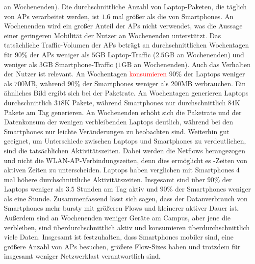 \documentclass[12pt, a4paper]{article}
\begin{document}
an Wochenenden). Die durchschnittliche Anzahl von Laptop-Paketen, die täglich von APs verarbeitet werden,
ist $1.6$ mal größer als die von Smartphones. An Wochenenden wird ein großer Anteil der APs nicht verwendet,
was die Aussage einer geringeren Mobilität der Nutzer an Wochenenden unterstützt.
Das tatsächliche Traffic-Volumen der APs beträgt an durchschnittlichen Wochentagen für $90 \%$ der APs
weniger als $5$\textsc{GB} Laptop-Traffic ($2.5$\textsc{GB} an Wochenenden) und weniger als $3$\textsc{GB} Smartphone-Traffic
($1$\textsc{GB} an Wochenenden).
Auch das Verhalten der Nutzer ist relevant. An Wochentagen \textcolor{red}{konsumieren} $90 \%$ der Laptops weniger als $700$\textsc{MB},
während $90 \%$ der Smartphones weniger als $200$\textsc{MB} verbrauchen.
Ein ähnliches Bild ergibt sich bei der Paketrate. An Wochentagen generieren Laptops durchschnittlich $318$\textsc{K} Pakete, 
während Smartphones nur durchschnittlich $84$\textsc{K} Pakete am Tag generieren. 
An Wochenenden erhöht sich die Paketrate und der Datenkonsum der wenigen verbleibenden Laptops deutlich,
während bei den Smartphones nur leichte Veränderungen zu beobachten sind.
Weiterhin gut geeignet, um Unterschiede zwischen Laptops und Smartphones zu verdeutlichen, sind die tatsächlichen Aktivitätszeiten.
Dabei werden die Netflows herangezogen und nicht die WLAN-AP-Verbindungszeiten, denn dies ermöglicht es -Zeiten
von aktiven Zeiten zu unterscheiden. Laptops haben verglichen mit Smartphones $4$ mal höhere durchschnittliche Aktivitätszeiten.
Insgesamt sind über $90 \%$ der Laptops weniger als $3.5$ Stunden am Tag aktiv und $90 \%$ der Smartphones weniger als eine Stunde.\newline
Zusammenfassend lässt sich sagen, dass der Datanverbrauch von Smartphones mehr bursty mit größeren Flows und kleinerer aktiver
Dauer ist. Außerdem sind an Wochenenden weniger Geräte am Campus, aber jene die verbleiben, sind überdurchschnittlich aktiv 
und konsumieren überdurchschnittlich viele Daten. Insgesamt ist festzuhalten, dass Smartphones mobiler sind, 
eine größere Anzahl von APs besuchen, größere Flow-Sizes haben und trotzdem für insgesamt weniger Netzwerklast 
verantwortlich sind.
\end{document}
